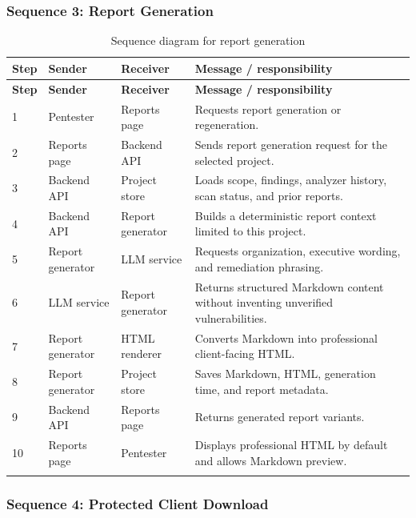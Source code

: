 \documentclass[12pt,a4paper]{report}
\begin{document}
\subsubsection{Sequence 3: Report Generation}

\begin{longtable}{|p{}|p{}|p{}|p{}|}
\hline
\textbf{Step} & \textbf{Sender} & \textbf{Receiver} & \textbf{Message / responsibility} \\
\hline
\endfirsthead
\hline
\textbf{Step} & \textbf{Sender} & \textbf{Receiver} & \textbf{Message / responsibility} \\
\hline
\endhead
1 & Pentester & Reports page & Requests report generation or regeneration. \\
\hline
2 & Reports page & Backend API & Sends report generation request for the selected project. \\
\hline
3 & Backend API & Project store & Loads scope, findings, analyzer history, scan status, and prior reports. \\
\hline
4 & Backend API & Report generator & Builds a deterministic report context limited to this project. \\
\hline
5 & Report generator & LLM service & Requests organization, executive wording, and remediation phrasing. \\
\hline
6 & LLM service & Report generator & Returns structured Markdown content without inventing unverified vulnerabilities. \\
\hline
7 & Report generator & HTML renderer & Converts Markdown into professional client-facing HTML. \\
\hline
8 & Report generator & Project store & Saves Markdown, HTML, generation time, and report metadata. \\
\hline
9 & Backend API & Reports page & Returns generated report variants. \\
\hline
10 & Reports page & Pentester & Displays professional HTML by default and allows Markdown preview. \\
\hline
\caption{Sequence diagram for report generation}
\label{tab:seq_report_generation}
\end{longtable}

\subsubsection{Sequence 4: Protected Client Download}
\end{document}
